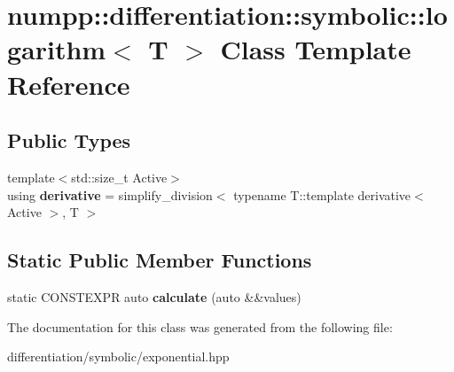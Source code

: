 \hypertarget{classnumpp_1_1differentiation_1_1symbolic_1_1logarithm}{}\section{numpp\+:\+:differentiation\+:\+:symbolic\+:\+:logarithm$<$ T $>$ Class Template Reference}
\label{classnumpp_1_1differentiation_1_1symbolic_1_1logarithm}
\subsection*{Public Types}
\begin{DoxyCompactItemize}
\item 
\mbox{\label{classnumpp_1_1differentiation_1_1symbolic_1_1logarithm_a79737a281cb9af31d12a834075e97cd9}} 
{\footnotesize template$<$std\+::size\+\_\+t Active$>$ }\\using {\bfseries derivative} = simplify\+\_\+division$<$ typename T\+::template derivative$<$ Active $>$, T $>$
\end{DoxyCompactItemize}
\subsection*{Static Public Member Functions}
\begin{DoxyCompactItemize}
\item 
\mbox{\label{classnumpp_1_1differentiation_1_1symbolic_1_1logarithm_adb7e0d51a4ce197cf1fe62bcffb4cdc6}} 
static C\+O\+N\+S\+T\+E\+X\+PR auto {\bfseries calculate} (auto \&\&values)
\end{DoxyCompactItemize}


The documentation for this class was generated from the following file\+:\begin{DoxyCompactItemize}
\item 
differentiation/symbolic/exponential.\+hpp\end{DoxyCompactItemize}
